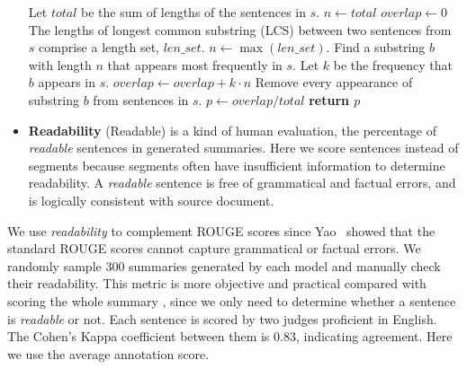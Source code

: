 \begin{itemize}
\begin{algorithm}[th]
\begin{algorithmic}[1]
\STATE Let $total$ be the sum of lengths of the sentences in $s$.
\STATE $n \leftarrow total$
\STATE $overlap \leftarrow 0$
\STATE The lengths of longest common substring (LCS) between two sentences from $s$ comprise a length set, $len\_set$.
\STATE $n \leftarrow \max(len\_set)$.
\STATE Find a substring $b$ with length $n$ that appears most frequently in $s$.
\STATE Let $k$ be the frequency that $b$ appears in $s$.
\STATE $overlap \leftarrow overlap + k\cdot n$
\STATE Remove every appearance of substring $b$ from sentences in $s$.
\ENDWHILE
\STATE $p \leftarrow overlap/total$
\STATE \textbf{return $p$} 
\end{algorithmic}
\end{algorithm}

\item \textbf{Readability} (Readable) is a kind of human evaluation, 
the percentage of
\textit{readable} sentences in generated summaries.
Here we score sentences instead of segments because segments often have
insufficient information to determine readability.
A \textit{readable} sentence is free of grammatical and 
factual errors, 
and is logically consistent with source document.
\end{itemize}

We use \textit{readability} to complement ROUGE scores 
since Yao~ showed that the standard 
ROUGE scores cannot capture grammatical or factual errors. 
We randomly sample 300 summaries generated by each model
and manually check their readability. 
This metric is more objective and practical compared with
scoring the whole summary \cite{D18-1205}, since we only need 
to determine whether a sentence is {\em readable} or not.
Each sentence is scored by two judges proficient in English. 
The Cohen's Kappa coefficient between them is $0.83$, 
indicating agreement. Here we use the average annotation score.

